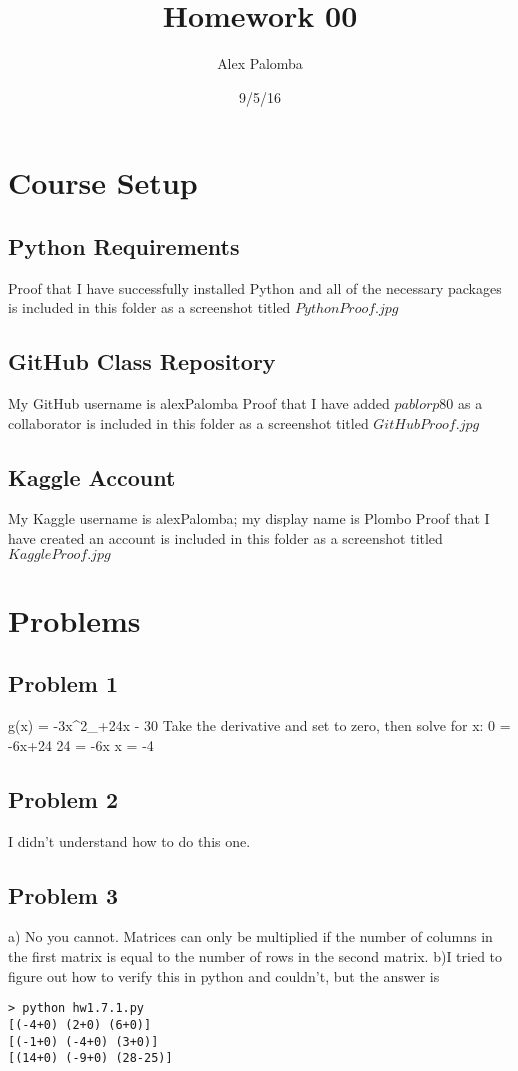 \documentclass[a4paper]{article}
\title{Homework 00}
\author{Alex Palomba}
\date{9/5/16}
\begin{document}
\lstset{language=Python}

\maketitle

\section{Course Setup}

\subsection{Python Requirements}
Proof that I have successfully installed Python and all of the necessary packages is included in this folder as a screenshot titled $PythonProof.jpg$

\subsection{GitHub Class Repository}
My GitHub username is alexPalomba
Proof that I have added $pablorp80$ as a collaborator is included in this folder as a screenshot titled $GitHubProof.jpg$

\subsection{Kaggle Account}
My Kaggle username is alexPalomba; my display name is Plombo
Proof that I have created an account is included in this folder as a screenshot titled $KaggleProof.jpg$

\section{Problems}

\subsection{Problem 1}
g(x) = -3x^2_+24x - 30
Take the derivative and set to zero, then solve for x:
0 = -6x+24
24 = -6x
x = -4

\subsection{Problem 2}
I didn't understand how to do this one.

\subsection{Problem 3}
a) No you cannot. Matrices can only be multiplied if the number of columns in the first matrix is equal to the number of rows in the second matrix. 
b)I tried to figure out how to verify this in python and couldn't, but the answer is 
\begin{lstlisting}
> python hw1.7.1.py 
[(-4+0) (2+0) (6+0)]
[(-1+0) (-4+0) (3+0)]
[(14+0) (-9+0) (28-25)]
\end{lstlisting}
\end{document}
